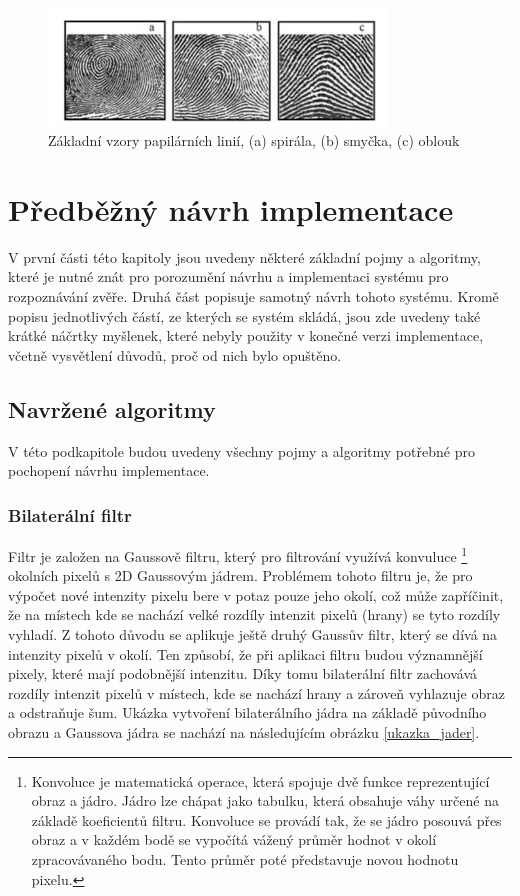\begin{figure}[h]
	\centering
	\includegraphics[width=0.8\textwidth]{obrazky/otisky.png}
	\caption{Základní vzory papilárních linií, (a) spirála, (b) smyčka, (c) oblouk \cite{otiskyPrstu}}
	\label{singularni_body}
\end{figure}


\chapter{Předběžný návrh implementace}
\label{predbezny_navrh}
V první části této kapitoly jsou uvedeny některé základní pojmy a algoritmy, které je nutné znát pro porozumění návrhu a implementaci systému pro rozpoznávání zvěře. Druhá část popisuje samotný návrh tohoto systému. Kromě popisu jednotlivých částí, ze kterých se systém skládá, jsou zde uvedeny také krátké náčrtky myšlenek, které nebyly použity v konečné verzi implementace, včetně vysvětlení důvodů, proč od nich bylo opuštěno.

\section{Navržené algoritmy}
V této podkapitole budou uvedeny všechny pojmy a algoritmy potřebné pro pochopení návrhu implementace.


\subsection{Bilaterální filtr}
\label{bilateral_chapter}


Filtr je založen na Gaussově filtru, který pro filtrování využívá konvuluce \footnote{Konvoluce je matematická operace, která spojuje dvě funkce reprezentující obraz a jádro. Jádro lze chápat jako tabulku, která obsahuje váhy určené na základě koeficientů filtru. Konvoluce se provádí tak, že se jádro posouvá přes obraz a v každém bodě se vypočítá vážený průměr hodnot v okolí zpracovávaného bodu. Tento průměr poté představuje novou hodnotu pixelu.} okolních pixelů s 2D Gaussovým jádrem. Problémem tohoto filtru je, že pro výpočet nové intenzity pixelu bere v potaz pouze jeho okolí, což může zapříčinit, že na místech kde se nachází velké rozdíly intenzit pixelů (hrany) se tyto rozdíly vyhladí. Z tohoto důvodu se aplikuje ještě druhý Gaussův filtr, který se dívá na intenzity pixelů v okolí. Ten způsobí, že při aplikaci filtru budou významnější pixely, které mají podobnější intenzitu. Díky tomu bilaterální filtr zachovává rozdíly intenzit pixelů v místech, kde se nachází hrany a zároveň vyhlazuje obraz a odstraňuje šum. Ukázka vytvoření bilaterálního jádra na základě původního obrazu a Gaussova jádra se nachází na následujícím obrázku \ref{ukazka_jader}.

